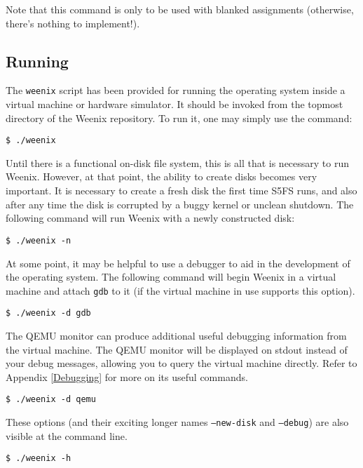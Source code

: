 Note that this command is only to be used with blanked assignments (otherwise, there's nothing to implement!).

\subsection{Running}
The \texttt{weenix} script has been provided for running the operating system inside a virtual machine or hardware simulator. It should be invoked from the topmost directory of the Weenix repository. To run it, one may simply use the command:
\begin{verbatim}
$ ./weenix\end{verbatim}

Until there is a functional on-disk file system, this is all that is necessary to run Weenix. However, at that point, the ability to create disks becomes very important. It is necessary to create a fresh disk the first time S5FS runs, and also after any time the disk is corrupted by a buggy kernel or unclean shutdown. The following command will run Weenix with a newly constructed disk:
\begin{verbatim}
$ ./weenix -n\end{verbatim}

At some point, it may be helpful to use a debugger to aid in the development of the operating system. The following command will begin Weenix in a virtual machine and attach \texttt{gdb} to it (if the virtual machine in use supports this option).
\begin{verbatim}
$ ./weenix -d gdb\end{verbatim}

The QEMU monitor can produce additional useful debugging information from the virtual machine. The QEMU monitor will be displayed on stdout instead of your debug messages, allowing you to query the virtual machine directly. Refer to Appendix \ref{Debugging} for more on its useful commands.
\begin{verbatim}
$ ./weenix -d qemu\end{verbatim}

These options (and their exciting longer names \texttt{--new-disk} and \texttt{--debug}) are also visible at the command line.
\begin{verbatim}
$ ./weenix -h\end{verbatim}



